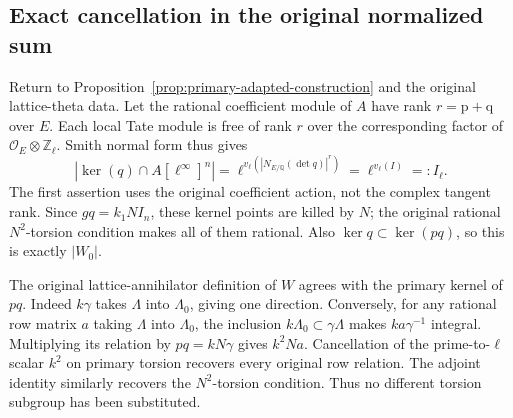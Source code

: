 \subsection*{Exact cancellation in the original normalized sum}

Return to Proposition~\ref{prop:primary-adapted-construction} and the
original lattice-theta data.  Let the rational coefficient module of
$A$ have rank $r=\mathrm{p}+\mathrm{q}$ over $E$.  Each local Tate
module is free of rank $r$ over the corresponding factor of
$\mathcal O_E\otimes\mathbb Z_\ell$.  Smith normal form thus gives
\[
 |\ker(q)\cap A[\ell^\infty]^n|
 =\ell^{v_\ell(|N_{E/\mathbb Q}(\det q)|^r)}
 =\ell^{v_\ell(I)}=:I_\ell.
\]
The first assertion uses the original coefficient action, not the
complex tangent rank.  Since $gq=k_1NI_n$, these kernel points are
killed by $N$; the original rational $N^2$-torsion condition makes all
of them rational.  Also $\ker q\subset\ker(pq)$, so this is exactly
$|W_0|$.

The original lattice-annihilator definition of $W$ agrees with the
primary kernel of $pq$.  Indeed $k\gamma$ takes $\Lambda$ into
$\Lambda_0$, giving one direction.  Conversely, for any rational row
matrix $a$ taking $\Lambda$ into $\Lambda_0$, the inclusion
$k\Lambda_0\subset\gamma\Lambda$ makes
$k a\gamma^{-1}$ integral.  Multiplying its relation by $pq=kN\gamma$
gives $k^2Na$.  Cancellation of the prime-to-$\ell$ scalar $k^2$ on
primary torsion recovers every original row relation.  The adjoint
identity similarly recovers the $N^2$-torsion condition.  Thus no
different torsion subgroup has been substituted.

